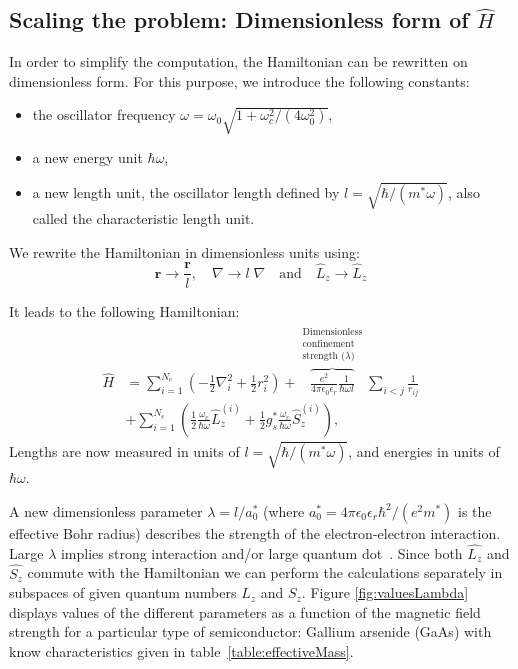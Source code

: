 \subsection{Scaling the problem: Dimensionless form of $\hat{H}$ }
\label{sec:scaling}
In order to simplify the computation, the Hamiltonian can be rewritten on dimensionless form.
For this purpose, we introduce the following constants:
\begin{itemize}
 \item the oscillator frequency $\omega = \omega_0\sqrt{1+\omega_c^2/ (4\omega_0^2)}$,
 \item a new energy unit $\hbar \omega$,
\item 	a new length unit, the oscillator length defined by $l=\sqrt{\hbar /(m^* \omega)}$, also called the characteristic length unit.
\end{itemize}

We rewrite the Hamiltonian in dimensionless units using:\\
$$\mathbf{r} \longrightarrow \frac{\mathbf{r}}{l}, \quad \nabla \longrightarrow l \;\nabla \quad \text{and} \quad \hat{L}_z \longrightarrow \hat{L}_z$$ 


It leads to the following Hamiltonian:
\begin{align}
\hat{H}&=\sum_{i=1}^{N_e} \left(  -\frac{1}{2} \nabla_i^2 + \frac{1}{2} r_i^2 \right)  + \overbrace{\frac{e^2}{4 \pi \epsilon_0 \epsilon_r} \frac{1}{\hbar \omega l}}^{\begin{smallmatrix}
  \text{Dimensionless} \\
 \text{confinement } \\
  \text{strength ($\lambda$)}
\end{smallmatrix}}
\sum_{i<j}\frac{1}{r_{ij}}  \nonumber \\
&+  \sum_{i=1}^{N_e} \left(  \frac{1}{2}  \frac{\omega_c}{\hbar \omega} \hat{L}_z^{(i)}+ \frac{1  }{2} g_s^* \frac{\omega_c}{\hbar \omega} \hat{S}_z^{(i)}\right),
\end{align}
Lengths are now measured in units of $l=\sqrt{\hbar/(m^*\omega)}$, and energies in units of $\hbar \omega$.
 
A new dimensionless parameter $\lambda=l / a_0^*$ (where $a_0^*= 4 \pi \epsilon_0 \epsilon_r \hbar^2 / (e^2 m^*)$ is the effective Bohr radius) describes the strength of the electron-electron interaction.
Large $\lambda$ implies strong interaction and/or large quantum dot~\cite{Tavernier2003}. Since both $\hat{L_z}$ and $\hat{S_z}$ commute with the Hamiltonian we can perform the calculations separately in subspaces of given quantum numbers $L_z$ and $S_z$.
Figure \ref{fig:valuesLambda} displays values of the different parameters as a function of the magnetic field strength for a particular type of semiconductor: Gallium arsenide (GaAs) with know characteristics given in table~\ref{table:effectiveMass}.

